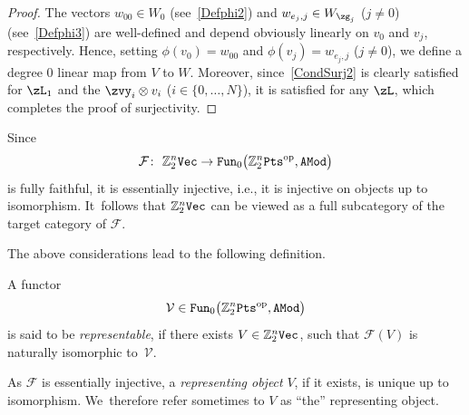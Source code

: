 \documentclass[10pt,a4paper]{amsart}
\newcommand{\op}[1]{\operatorname{#1}}
\newcommand{\catname}[1]{\textnormal{\texttt{#1}}}
\newcommand{\Z}{{\mathbb Z}}
\def\cF{\mathcal{F}}
\newcommand{\0}{\otimes}
\numberwithin{equation}{section}
\begin{document}
\begin{proof}
The vectors $w_{00}\in W_{0}$ (see~\eqref{Defphi2}) and $w_{e_j,j}\in W_{\zg_j}$ ($j\neq 0$) (see~\eqref{Defphi3}) are well-defined and depend obviously linearly on $v_0$ and $v_j$, respectively. Hence, setting $\phi(v_0)=w_{00}$ and $\phi(v_j)=w_{e_j,j}$ ($j\neq 0$), we define a degree 0 linear map from $V$ to $W$. Moreover, since~\eqref{CondSurj2} is clearly satisfied for $\zL_1$ and the $\zvy_i\0 v_i$ ($i\in\{0,\dots,N\}$), it is satisfied for any $\zL$, which completes the proof of surjectivity.
\end{proof}

Since
\[
\cF\colon\ \Z_2^n{\tt Vec}\to {\tt Fun}_0\big(\Z_2^n{\tt Pts}^{\op{op}},\tt AMod\big)
\]
is fully faithful, it is essentially injective, i.e., it is injective on objects up to isomorphism. It~follows that $\Z_2^n{\tt Vec}$ can be viewed as a full subcategory of the target category of $\cF$.

%
The above considerations lead to the following definition.
%
\begin{Definition}%
A functor
%
\[
\mathcal{V}\in{\tt Fun}_0\big(\Z_2^n\catname{Pts}^\textnormal{op}, \catname{AMod}\big)
\]
%
is said to be \emph{representable}, if there exists $V\in\Z_2^n\tt Vec$, such that $\cF(V)$ is naturally isomorphic to~$\mathcal{V}$.
\end{Definition}

As $\cF$ is essentially injective, a {\it representing object} $V$, if it exists, is unique up to isomorphism. We~therefore refer sometimes to $V$ as ``the'' representing object.

%
\end{document}
